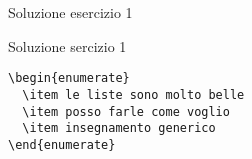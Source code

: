 \begin{frame}[fragile]{Soluzione esercizio 1}

\begin{soluzione}{Soluzione sercizio 1}
\begin{code}
\begin{verbatim}
\begin{enumerate}
  \item le liste sono molto belle
  \item posso farle come voglio
  \item insegnamento generico
\end{enumerate}
\end{verbatim}
\end{code}
\end{soluzione}

\end{frame}
